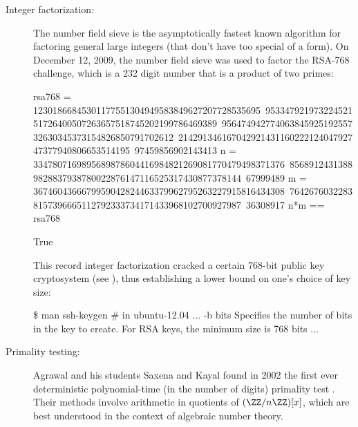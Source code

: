\begin{description}
\item[Integer factorization:]
The number field sieve is the asymptotically fastest known algorithm for
factoring general large integers (that don't have too special of a
form).  On December 12, 2009, the number field sieve was used to
factor the RSA-768 challenge, which is a 232 digit number that is a
product of two primes:
\begin{sagecode}
\begin{sagecell}
rsa768 = 12301866845301177551304949583849627207728535695\
95334792197322452151726400507263657518745202199786469389\
95647494277406384592519255732630345373154826850791702612\
21429134616704292143116022212404792747377940806653514195\
97459856902143413
n = 3347807169895689878604416984821269081770479498371376\
85689124313889828837938780022876147116525317430877378144\
67999489
m = 3674604366679959042824463379962795263227915816434308\
76426760322838157396665112792333734171433968102700927987\
36308917
n*m == rsa768
\end{sagecell}
\begin{sageout}
True
\end{sageout}
\end{sagecode}
This record integer factorization cracked a certain 768-bit public key
cryptosystem (see \cite{cryptoeprint:2010:006}), thus
establishing a lower bound on one's choice of key size:
\begin{sagecode}
\begin{sagecell}[language=bash]
\$ man ssh-keygen   # in ubuntu-12.04
...
     -b bits
             Specifies the number of bits in the key to
             create. For RSA keys, the minimum size is
             768 bits ...
\end{sagecell}
\end{sagecode}

\item[Primality testing:]
Agrawal and his students Saxena and
Kayal found in 2002 the first ever deterministic
polynomial-time (in the number of digits) primality test
\cite{agrawal2004primes}. Their methods involve arithmetic
in quotients of $(\ZZ/n\ZZ)[x]$, which are best understood in
the context of algebraic number theory.


\end{description}
